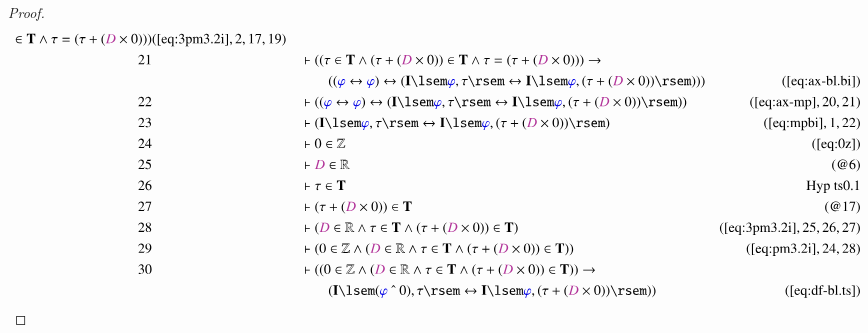 \begin{proof}
\begin{align}
      \in \mathbf{T} \wedge \tau = ( \tau + ( \mc{D} \times
      0 ) ) )&(\mbox{\ref{eq:3pm3.2i}},2,17,19)\notag
  \\ 21 &&  & \vdash ( ( \tau \in \mathbf{T} \wedge ( \tau + ( \mc{D} \times 0 )
      ) \in \mathbf{T} \wedge \tau = ( \tau + ( \mc{D}
      \times 0 ) ) ) \rightarrow  \notag \\ & & & \qquad
      ( ( \mw{\varphi}
      \leftrightarrow \mw{\varphi} ) \leftrightarrow (
      \mathbf{I} \lsem \mw{\varphi} , \tau \rsem
      \leftrightarrow \mathbf{I} \lsem \mw{\varphi} , (
      \tau + ( \mc{D} \times 0 ) ) \rsem ) )
      )&(\mbox{\ref{eq:ax-bl.bi}})\notag
  \\ 22 &&  & \vdash ( ( \mw{\varphi} \leftrightarrow \mw{\varphi} )
      \leftrightarrow ( \mathbf{I} \lsem \mw{\varphi} ,
      \tau \rsem \leftrightarrow \mathbf{I} \lsem
      \mw{\varphi} , ( \tau + ( \mc{D} \times 0 ) ) \rsem )
      )&(\mbox{\ref{eq:ax-mp}},20,21)\notag
  \\ 23 &&  & \vdash ( \mathbf{I} \lsem \mw{\varphi} , \tau \rsem
      \leftrightarrow \mathbf{I} \lsem \mw{\varphi} , (
      \tau + ( \mc{D} \times 0 ) ) \rsem
      )&(\mbox{\ref{eq:mpbi}},1,22)\notag
  \\ 24 &&  & \vdash 0 \in \mathbb{Z}&(\mbox{\ref{eq:0z}})\notag
  \\ 25 &&  & \vdash \mc{D} \in \mathbb{R}&(@6)\notag
  \\ 26 &&  & \vdash \tau \in \mathbf{T}&\text{Hyp~ts0.1}\notag%
  \\ 27 &&  & \vdash ( \tau + ( \mc{D} \times 0 ) ) \in \mathbf{T}&(@17)\notag
  \\ 28 &&  & \vdash ( \mc{D} \in \mathbb{R} \wedge \tau \in \mathbf{T} \wedge
      ( \tau + ( \mc{D} \times 0 ) ) \in \mathbf{T}
      )&(\mbox{\ref{eq:3pm3.2i}},25,26,27)\notag
  \\ 29 &&  & \vdash ( 0 \in \mathbb{Z} \wedge ( \mc{D} \in \mathbb{R} \wedge
      \tau \in \mathbf{T} \wedge ( \tau + ( \mc{D} \times 0
      ) ) \in \mathbf{T} )
      )&(\mbox{\ref{eq:pm3.2i}},24,28)\notag
  \\ 30 &&  & \vdash ( ( 0 \in \mathbb{Z} \wedge ( \mc{D} \in \mathbb{R} \wedge
      \tau \in \mathbf{T} \wedge ( \tau + ( \mc{D} \times 0
      ) ) \in \mathbf{T} ) ) \rightarrow  \notag \\ & & & \qquad
      ( \mathbf{I} \lsem
      ( \mw{\varphi} ~\string^~ 0 ) , \tau \rsem
      \leftrightarrow \mathbf{I} \lsem \mw{\varphi} , (
      \tau + ( \mc{D} \times 0 ) ) \rsem )
      )&(\mbox{\ref{eq:df-bl.ts}})\notag

\end{align}
\end{proof}
